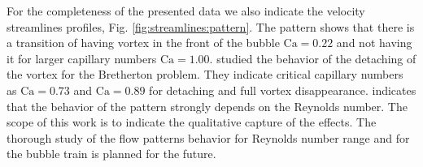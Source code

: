 \documentclass[preprint,12pt]{elsarticle}
\newcommand{\Ca}{\mathrm{Ca}}
\begin{document}
{\color{red} For the completeness of the presented data we also indicate the velocity streamlines
profiles, Fig. \ref{fig:streamlines:pattern}. The pattern shows that there is a transition of
having vortex in the front of the bubble $\Ca=0.22$ and not having it for larger capillary numbers
$\Ca=1.00$. \citet{giavedoni-numerical} studied the behavior of the detaching of the vortex for the
Bretherton problem. They indicate critical capillary numbers as $\Ca=0.73$ and $\Ca=0.89$ for
detaching and full vortex disappearance. \citet{heil-bretherton} indicates that the behavior of the
pattern strongly depends on the Reynolds number. The scope of this work is to indicate the
qualitative capture of the effects. The thorough study of the flow patterns behavior for Reynolds
number range and for the bubble train is planned for the future. 
}
\begin{figure}

\end{figure}
\end{document}
